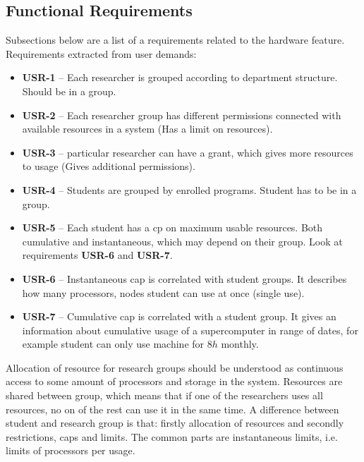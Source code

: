 \documentclass{report}
\begin{document}
\subsection{Functional Requirements}

Subsections below are a list of a requirements related to the hardware feature.
Requirements extracted from user demands:
\begin{itemize}
	\item
	{
		\textbf{USR-1} -- Each researcher is grouped according to department structure. Should be in a group.
	}
	\item
	{
		\textbf{USR-2} -- Each researcher group has different permissions connected with available resources in a system (Has a limit on resources).
	}
	\item
	{
		\textbf{USR-3} -- particular researcher can have a grant, which gives more resources to usage (Gives additional permissions).
	}
	\item
	{
		\textbf{USR-4} -- Students are grouped by enrolled programs. Student has to be in a group.
	}
	\item
	{
		\textbf{USR-5} -- Each student has a cp on maximum usable resources. Both cumulative and instantaneous, which may depend on their group. Look at requirements \textbf{USR-6} and \textbf{USR-7}.
	}
	\item
	{
		\textbf{USR-6} -- Instantaneous cap is correlated with student groups. It describes how many processors, nodes student can use at once (single use).
	}
	\item
	{
		\textbf{USR-7} -- Cumulative cap is correlated with a student group. It gives an information about cumulative usage of a supercomputer in range of dates, for example student can only use machine for $8h$ monthly.
	}
\end{itemize}

	Allocation of resource for research groups should be understood as continuous access to some amount of processors and storage in the system. Resources are shared between group, which means that if one of the researchers uses all resources, no on of the rest can use it in the same time. A difference between student and research group is that: firstly allocation of resources and secondly restrictions, caps and limits. The common parts are instantaneous limits, i.e. limits of processors per usage.
	
\end{document}
